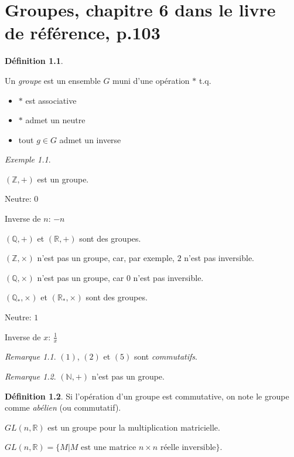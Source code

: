 \documentclass{report}
\newcommand*{\reels}{\mathbb{R}}
\newcommand*{\entiers}{\mathbb{Z}}
\newcommand*{\rationels}{\mathbb{Q}}
\newcommand*{\naturels}{\mathbb{N}}
\theoremstyle{definition}
\newtheorem*{defin}{D\'efinition}
\theoremstyle{remark}
\newtheorem*{exem}{Exemple}
\newtheorem*{rema}{Remarque}
\begin{document}
	\chapter[Groupes]{Groupes, chapitre 6 dans le livre de r\'ef\'erence, p.103}
	\begin{defin}
		~

		Un \emph{groupe} est un ensemble $G$ muni d'une op\'eration $*$ t.q.
		\begin{itemize}
			\item[(A)] $*$ est associative
			\item[(N)] $*$ admet un neutre
			\item[(I)] tout $g \in G$ admet un inverse
		\end{itemize}
	\end{defin}
	\begin{exem}
		~

		\begin{nlist}
			\item $(\entiers,+)$ est un groupe.

			Neutre: $0$

			Inverse de $n$: $-n$
			\item $(\rationels,+)$ et $(\reels,+)$ sont des groupes.
			\item $(\entiers,\times)$ n'est pas un groupe, car, par exemple, $2$ n'est pas inversible.
			\item $(\rationels,\times)$ n'est pas un groupe, car $0$ n'est pas inversible.
			\item $(\rationels_*,\times)$ et $(\reels_*,\times)$ sont des groupes.

			Neutre: $1$

			Inverse de $x$: $\frac{1}{x}$
		\end{nlist}
		\begin{rema}
			$(1)$, $(2)$ et $(5)$ sont \emph{commutatifs}.
		\end{rema}
		\begin{rema}
			$(\naturels,+)$ n'est pas un groupe.
		\end{rema}
		\begin{defin}
			Si l'op\'eration d'un groupe est commutative, on note le groupe comme \emph{ab\'elien} (ou commutatif).
		\end{defin}
		\begin{nlist}[resume]
			\item $GL(n,\reels)$ est un groupe pour la multiplication matricielle.

			$GL(n,\reels)=\{M|M \text{ est une matrice $n\times n$ r\'eelle inversible}\}$.


\end{nlist}
\end{exem}
\end{document}
